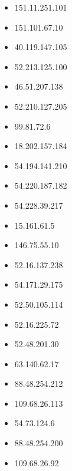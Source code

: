 \documentclass{article}
\begin{document}
\begin{itemize}
        \item 151.11.251.101
    
        \item 151.101.67.10
    
        \item 40.119.147.105
    
        \item 52.213.125.100
    
        \item 46.51.207.138
    
        \item 52.210.127.205
    
        \item 99.81.72.6
    
        \item 18.202.157.184
    
        \item 54.194.141.210
    
        \item 54.220.187.182
    
        \item 54.228.39.217
    
        \item 15.161.61.5
    
        \item 146.75.55.10
    
        \item 52.16.137.238
    
        \item 54.171.29.175
    
        \item 52.50.105.114
    
        \item 52.16.225.72
    
        \item 52.48.201.30
    
        \item 63.140.62.17
    
        \item 88.48.254.212
    
        \item 109.68.26.113
    
        \item 54.73.124.6
    
        \item 88.48.254.200
    
        \item 109.68.26.92
    

\end{itemize}
\end{document}
